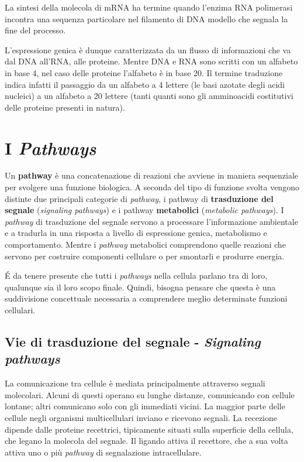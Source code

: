 La sintesi della molecola di mRNA ha termine quando l'enzima RNA polimerasi incontra una sequenza particolare nel filamento di DNA modello che segnala la fine del processo.

L'espressione genica è dunque caratterizzata da un flusso di informazioni che va dal DNA all'RNA, alle proteine. 
Mentre DNA e RNA sono scritti con un alfabeto in base 4, nel caso delle proteine l'alfabeto è in base 20.
Il termine traduzione indica infatti il passaggio da un alfabeto a 4 lettere (le basi azotate degli acidi nucleici) a un alfabeto a 20 lettere (tanti quanti sono gli amminoacidi costitutivi delle proteine presenti in natura).

\section{I \textit{Pathways}}
\label{sec:pathways}
Un \textbf{pathway} è una concatenazione di reazioni che avviene in maniera sequenziale per svolgere una funzione biologica. 
A seconda del tipo di funzione svolta vengono distinte due principali categorie di \textit{pathway}, i pathway di \textbf{trasduzione del segnale} (\textit{signaling pathways}) e i pathway \textbf{metabolici} (\textit{metabolic pathways}).
I \textit{pathway} di trasduzione del segnale servono a processare l'informazione ambientale e a tradurla in una risposta a livello di espressione genica, metabolismo e comportamento.
Mentre i \textit{pathway} metabolici comprendono quelle reazioni che servono per costruire componenti cellulare o per smontarli e produrre energia.

\'E da tenere presente che tutti i \textit{pathways} nella cellula parlano tra di loro, qualunque sia il loro scopo finale. Quindi, bisogna pensare che questa è una suddivisione concettuale necessaria a comprendere meglio determinate funzioni cellulari.

\subsection{Vie di trasduzione del segnale - \textit{Signaling pathways}}
\label{sec:signaling}
La comunicazione tra cellule è mediata principalmente attraverso segnali molecolari. 
Alcuni di questi operano su lunghe distanze, comunicando con cellule lontane; altri comunicano solo con gli immediati vicini. 
La maggior parte delle cellule negli organismi multicellulari inviano e ricevono segnali. 
La recezione dipende dalle proteine recettrici, tipicamente situati sulla superficie della cellula, che legano la molecola del segnale.
Il ligando attiva il recettore, che a sua volta attiva uno o più \textit{pathway} di segnalazione intracellulare.\cite{alberts2000molecular}

